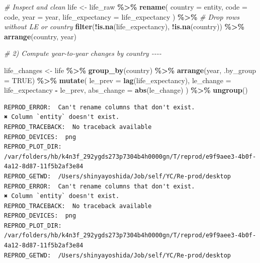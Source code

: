 \documentclass[
  11pt,
]{article}
\newenvironment{Shaded}{\begin{snugshade}}{\end{snugshade}}
\newcommand{\AttributeTok}[1]{\textcolor[rgb]{0.13,0.29,0.53}{#1}}
\newcommand{\CommentTok}[1]{\textcolor[rgb]{0.56,0.35,0.01}{\textit{#1}}}
\newcommand{\ConstantTok}[1]{\textcolor[rgb]{0.56,0.35,0.01}{#1}}
\newcommand{\FunctionTok}[1]{\textcolor[rgb]{0.13,0.29,0.53}{\textbf{#1}}}
\newcommand{\NormalTok}[1]{#1}
\newcommand{\OtherTok}[1]{\textcolor[rgb]{0.56,0.35,0.01}{#1}}
\newcommand{\SpecialCharTok}[1]{\textcolor[rgb]{0.81,0.36,0.00}{\textbf{#1}}}
\newcommand{\StringTok}[1]{\textcolor[rgb]{0.31,0.60,0.02}{#1}}
\newenvironment{rpoutput}{\vspace{0.5em}\begin{snugshade}}{\end{snugshade}}
\begin{document}
\begin{Shaded}
\begin{Highlighting}[]
\CommentTok{\# Inspect and clean}
\NormalTok{life }\OtherTok{\textless{}{-}}\NormalTok{ life\_raw }\SpecialCharTok{\%\textgreater{}\%}
  \FunctionTok{rename}\NormalTok{(}
    \AttributeTok{country =}\NormalTok{ entity,}
    \AttributeTok{code =}\NormalTok{ code,}
    \AttributeTok{year =}\NormalTok{ year,}
    \AttributeTok{life\_expectancy =} \StringTok{\textasciigrave{}}\AttributeTok{life\_expectancy}\StringTok{\textasciigrave{}}
\NormalTok{  ) }\SpecialCharTok{\%\textgreater{}\%}
  \CommentTok{\# Drop rows without LE or country}
  \FunctionTok{filter}\NormalTok{(}\SpecialCharTok{!}\FunctionTok{is.na}\NormalTok{(life\_expectancy), }\SpecialCharTok{!}\FunctionTok{is.na}\NormalTok{(country)) }\SpecialCharTok{\%\textgreater{}\%}
  \FunctionTok{arrange}\NormalTok{(country, year)}

\CommentTok{\# 2) Compute year{-}to{-}year changes by country {-}{-}{-}{-}}

\NormalTok{life\_changes }\OtherTok{\textless{}{-}}\NormalTok{ life }\SpecialCharTok{\%\textgreater{}\%}
  \FunctionTok{group\_by}\NormalTok{(country) }\SpecialCharTok{\%\textgreater{}\%}
  \FunctionTok{arrange}\NormalTok{(year, }\AttributeTok{.by\_group =} \ConstantTok{TRUE}\NormalTok{) }\SpecialCharTok{\%\textgreater{}\%}
  \FunctionTok{mutate}\NormalTok{(}
    \AttributeTok{le\_prev =} \FunctionTok{lag}\NormalTok{(life\_expectancy),}
    \AttributeTok{le\_change =}\NormalTok{ life\_expectancy }\SpecialCharTok{{-}}\NormalTok{ le\_prev,}
    \AttributeTok{abs\_change =} \FunctionTok{abs}\NormalTok{(le\_change)}
\NormalTok{  ) }\SpecialCharTok{\%\textgreater{}\%}
  \FunctionTok{ungroup}\NormalTok{()}
\end{Highlighting}
\end{Shaded}

\begin{rpoutput}

\begin{verbatim}
REPROD_ERROR:  Can't rename columns that don't exist.
✖ Column `entity` doesn't exist. 
REPROD_TRACEBACK:  No traceback available  
REPROD_DEVICES:  png 
REPROD_PLOT_DIR:  /var/folders/hb/k4n3f_292ygds273p7304b4h0000gn/T/reprod/e9f9aee3-4b0f-4a12-8d87-11f5b2af3e84 
REPROD_GETWD:  /Users/shinyayoshida/Job/self/YC/Re-prod/desktop 
REPROD_ERROR:  Can't rename columns that don't exist.
✖ Column `entity` doesn't exist. 
REPROD_TRACEBACK:  No traceback available  
REPROD_DEVICES:  png 
REPROD_PLOT_DIR:  /var/folders/hb/k4n3f_292ygds273p7304b4h0000gn/T/reprod/e9f9aee3-4b0f-4a12-8d87-11f5b2af3e84 
REPROD_GETWD:  /Users/shinyayoshida/Job/self/YC/Re-prod/desktop 
\end{verbatim}

\end{rpoutput}
\end{document}
